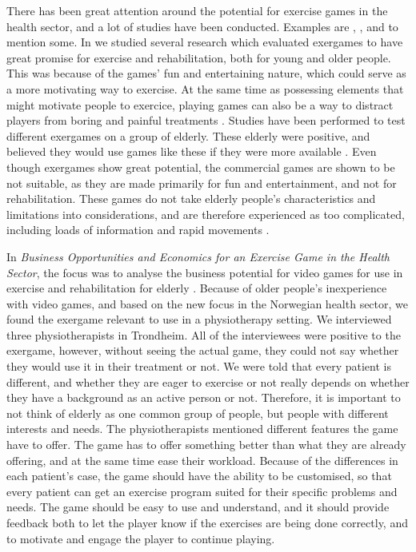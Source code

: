 There has been great attention around the potential for exercise games in the health sector, and a lot of studies have been conducted. Examples are \cite{exergamesforelderly}, \cite{gerling1}, \cite{ijsselsteijn2007digital} and \cite{garcia2012exergames} to mention some. In \cite{project} we studied several research which evaluated exergames to have great promise for exercise and rehabilitation, both for young and older people. This was because of the games' fun and entertaining nature, which could serve as a more motivating way to exercise. At the same time as possessing elements that might motivate people to exercice, playing games can also be a way to distract players from boring and painful treatments \cite{taylor2011activity}. Studies have been performed to test different exergames on a group of elderly. These elderly were positive, and believed they would use games like these if they were more available \cite{excell}. Even though exergames show great potential, the commercial games are shown to be not suitable, as they are made primarily for fun and entertainment, and not for rehabilitation. These games do not take elderly people's characteristics and limitations into considerations, and are therefore experienced as too complicated, including loads of information and rapid movements \cite{exergamesforelderly}.

In \emph{Business Opportunities and Economics for an Exercise Game in the Health Sector}, the focus was to analyse the business potential for video games for use in exercise and rehabilitation for elderly \cite{project}. Because of older people's inexperience with video games, and based on the new focus in the Norwegian health sector, we found the exergame relevant to use in a physiotherapy setting. We interviewed three physiotherapists in Trondheim. All of the interviewees were positive to the exergame, however, without seeing the actual game, they could not say whether they would use it in their treatment or not. We were told that every patient is different, and whether they are eager to exercise or not really depends on whether they have a background as an active person or not. Therefore, it is important to not think of elderly as one common group of people, but people with different interests and needs. The physiotherapists mentioned different features the game have to offer. The game has to offer something better than what they are already offering, and at the same time ease their workload. Because of the differences in each patient's case, the game should have the ability to be customised, so that every patient can get an exercise program suited for their specific problems and needs. The game should be easy to use and understand, and it should provide feedback both to let the player know if the exercises are being done correctly, and to motivate and engage the player to continue playing. 

